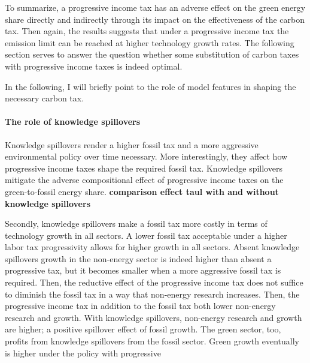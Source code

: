 To summarize, a progressive income tax has an adverse effect on the green energy share directly and indirectly through its impact on the effectiveness of the carbon tax.
Then again, the results suggests that under a progressive income tax the emission limit can be reached at higher technology growth rates. 
The following section serves to answer the question whether some substitution of  carbon taxes with progressive income taxes is indeed optimal. 
 
 In the following, I will briefly point to the role of model features in shaping the necessary carbon tax. 

\paragraph{The role of knowledge spillovers}
Knowledge spillovers render a higher fossil tax and a more aggressive environmental policy over time necessary. 
More interestingly, they affect how progressive income taxes shape the required fossil tax. Knowledge spillovers mitigate the adverse compositional effect of progressive income taxes on the green-to-fossil energy share. \textbf{comparison effect taul with and without knowledge spillovers}%

Secondly, knowledge spillovers make a fossil tax more costly in terms of technology growth in all sectors.  A lower fossil tax acceptable under a higher labor tax progressivity allows for higher growth in all sectors. 
Absent knowledge spillovers growth in the non-energy sector is indeed higher than absent a progressive tax, but it becomes smaller when a more aggressive fossil tax is required. Then, the reductive effect of the progressive income tax does not suffice to diminish the fossil tax in a way that non-energy research increases. Then, the progressive income tax in addition to the fossil tax both lower non-energy research and growth. With knowledge spillovers, non-energy research and growth are higher; a positive spillover effect of fossil growth. The green sector, too, profits from knowledge spillovers from the fossil sector. Green growth eventually is higher under the policy with progressive 

